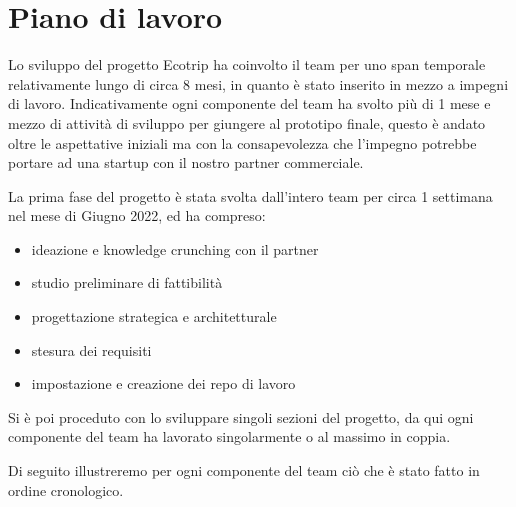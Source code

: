 
\section{Piano di lavoro}

Lo sviluppo del progetto Ecotrip ha coinvolto il team per uno span temporale relativamente lungo di circa 8 mesi, 
in quanto è stato inserito in mezzo a impegni di lavoro.
Indicativamente ogni componente del team ha svolto più di 1 mese e mezzo di attività di sviluppo per giungere al prototipo finale, 
questo è andato oltre le aspettative iniziali ma con la consapevolezza che l'impegno potrebbe portare ad una startup 
con il nostro partner commerciale.

La prima fase del progetto è stata svolta dall'intero team per circa 1 settimana nel mese di Giugno 2022, ed ha compreso:
\begin{itemize}
    \item ideazione e knowledge crunching con il partner
    \item studio preliminare di fattibilità
    \item progettazione strategica e architetturale
    \item stesura dei requisiti
    \item impostazione e creazione dei repo di lavoro
\end{itemize}

Si è poi proceduto con lo sviluppare singoli sezioni del progetto, da qui ogni componente del team ha lavorato singolarmente o al massimo in coppia.

Di seguito illustreremo per ogni componente del team ciò che è stato fatto in ordine cronologico.

